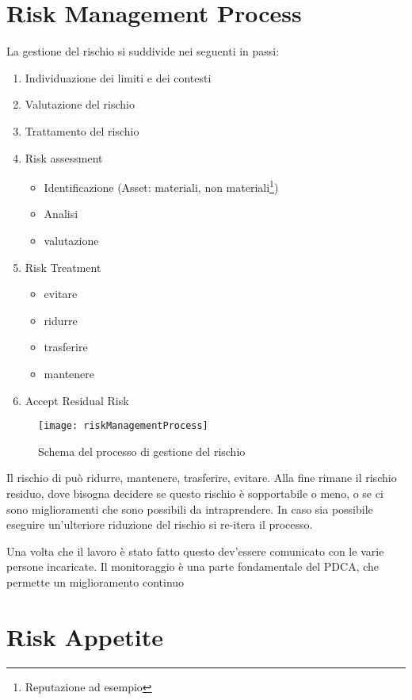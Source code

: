 \section{Risk Management Process}
La gestione del rischio si suddivide nei seguenti in passi:
\begin{enumerate}
\item Individuazione dei limiti e dei contesti
\item Valutazione del rischio
\item Trattamento del rischio
\item Risk assessment
\begin{itemize}
  \item Identificazione (Asset: materiali, non materiali\footnote{Reputazione ad
esempio})
  \item Analisi
  \item valutazione
\end{itemize}
\item Risk Treatment
\begin{itemize}
  \item evitare
  \item ridurre
  \item trasferire
  \item mantenere
\end{itemize}
\item Accept Residual Risk
\end{enumerate}

\begin{figure}[H]
 \centering
 \texttt{[image: riskManagementProcess]}
 \caption{Schema del processo di gestione del rischio}
\end{figure}


Il rischio di può ridurre, mantenere, trasferire, evitare. Alla fine rimane il
rischio residuo, dove bisogna decidere se questo rischio è sopportabile o meno,
o se ci sono miglioramenti che sono possibili da intraprendere. In caso sia
possibile eseguire un'ulteriore riduzione del rischio si re-itera il processo.

Una volta che il lavoro è stato fatto questo dev'essere comunicato con le varie
persone incaricate. Il monitoraggio è una parte fondamentale del PDCA, che
permette un miglioramento continuo






\section{Risk Appetite}

